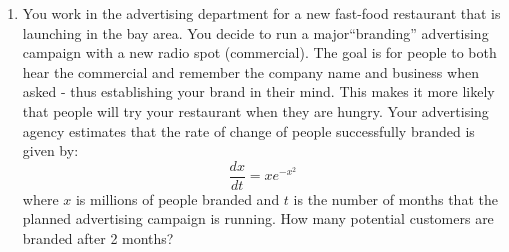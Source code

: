 \documentclass[letterpaper,12pt,fleqn]{article}
\begin{document}
\begin{enumerate}[left=0pt]
  \newpage

\item You work in the advertising department for a new fast-food restaurant that is launching in the bay area.  You decide to
  run a major``branding'' advertising campaign with a new radio spot (commercial).  The goal is for people to both hear the
  commercial and remember the company name and business when asked - thus establishing your brand in their mind.  This makes it
  more likely that people will try your restaurant when they are hungry.  Your advertising agency estimates that the rate of
  change of people successfully branded is given by:
  \[\frac{dx}{dt}=xe^{-x^2}\]
  where \(x\) is millions of people branded and \(t\) is the number of months that the planned advertising campaign is running.
  How many potential customers are branded after 2 months?
\end{enumerate}
\end{document}
